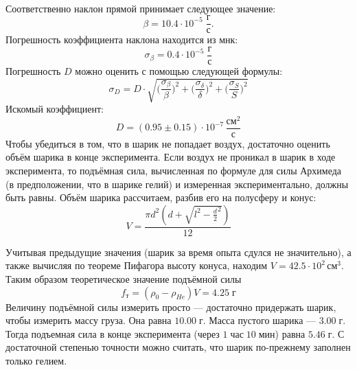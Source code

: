 \documentclass[a4paper,12pt]{article}
\begin{document}
  \begin{center}
	\
\end{center}
Соответственно наклон прямой принимает следующее значение:
$$\beta = 10.4\cdot10^{-5} \;  \frac{г}{с}.$$
Погрешность коэффициента наклона находится из мнк:
$$\sigma_{\beta} = 0.4 \cdot 10^{-5} \; \frac{г}{с}$$
Погрешность $D$ можно оценить с помощью следующей формулы:
$$\sigma_D = D \cdot \sqrt{\Big(\frac{\sigma_{\beta}}{\beta}\Big)^2 + \Big(\frac{\sigma_{\delta}}{\delta}\Big)^2 + \Big(\frac{\sigma_{S}}{S}\Big)^2 }$$
Искомый коэффициент:
$$D = (0.95\pm0.15)\cdot10^{-7}\, \frac{см^2}{с}$$
Чтобы убедиться в том, что в шарик не попадает воздух, достаточно оценить объём шарика в конце эксперимента. Если воздух не проникал в шарик в ходе эксперимента, то подъёмная сила, вычисленная по формуле для силы Архимеда (в предположении, что в шарике гелий) и измеренная экспериментально, должны быть равны. Объём шарика рассчитаем, разбив его на полусферу и конус:
\begin{equation}
V=\frac{\pi d^2(d+\sqrt{l^2-{\frac d 2}^2})} {12}
\end{equation}

Учитывая предыдущие значения (шарик за время опыта сдулся не значительно), а также вычисляя по теореме Пифагора высоту конуса, находим $V=42.5\cdot10^2\, см^3$. Таким образом теоретическое значение подъёмной силы $$f_т = (\rho_{0} - \rho_{He})V = 4.25 \; г$$
Величину подъёмной силы измерить просто — достаточно придержать шарик, чтобы измерить массу груза. Она равна $10.00 \; г$. Масса пустого шарика — $3.00 \; г$. Тогда подъемная сила в конце эксперимента (через $1 \; час \;10 \; мин$) равна $5.46 \; г$. С достаточной степенью точности можно считать, что шарик по-прежнему заполнен только гелием.
\end{document}
